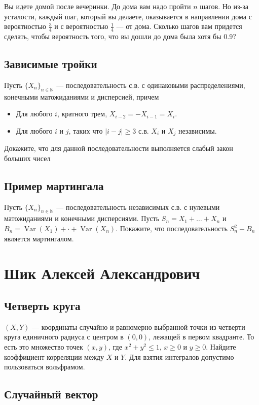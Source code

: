 \documentclass[12pt]{article}
\newcommand\N{\mathbb{N}}
\DeclareMathOperator{\Var}{Var}
\begin{document}
Вы идете домой после вечеринки. До дома вам надо пройти $n$ шагов. Но из-за усталости, каждый шаг, который вы делаете, оказывается в направлении дома с вероятностью $\frac{3}{4}$ и с вероятностью $\frac{1}{4}$ --- от дома. Сколько шагов вам придется сделать, чтобы вероятность того, что вы дошли до дома была хотя бы $0.9$?

\subsection{Зависимые тройки}
Пусть $\{X_n\}_{n \in \N}$ --- последовательность с.в. с одинаковыми распределениями, конечными матожиданиями и дисперсией, причем
\begin{itemize}
    \item Для любого $i$, кратного трем, $X_{i - 2} = - X_{i - 1} = X_{i}$. 
    \item Для любого $i$ и $j$, таких что $|i - j| \ge 3$ с.в. $X_i$ и $X_j$ независимы.
\end{itemize}
Докажите, что для данной последовательности выполняется слабый закон больших чисел


\subsection{Пример мартингала}

Пусть $\{X_n\}_{n \in \N}$ --- последовательность независимых с.в. с нулевыми матожиданиями и конечными дисперсиями. Пусть $S_n = X_1 + \dots + X_n$ и $B_n = \Var(X_1) + \cdot + \Var(X_n)$. Покажите, что последовательность $S_n^2 - B_n$ является мартингалом.


\newpage
\section{Шик Алексей Александрович}

\subsection{Четверть круга}

$(X, Y)$ --- координаты случайно и равномерно выбранной точки из четверти круга единичного радиуса с центром в $(0, 0)$, лежащей в первом квадранте. То есть это множество точек $(x, y)$, где $x^2 + y^2 \le 1$, $x \ge 0$ и $y \ge 0$. Найдите коэффициент корреляции между $X$ и $Y$. Для взятия интегралов  допустимо пользоваться вольфрамом.


\subsection{Случайный вектор}
\end{document}
